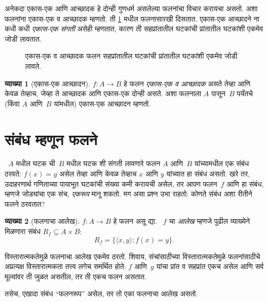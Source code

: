 \documentclass[11pt,a4paper,openany]{book}
\theoremstyle{definition}
\newtheorem{defn}{व्याख्या}[section]
\newenvironment{explain}{}{}
\newcommand{\Setabs}[2]{\{#1:#2\}}
\newcommand{\tuple}[1]{\langle #1\rangle}
\newcommand{\olasset}[2][0.52\textwidth]{\centering\resizebox{#1}{!}{}}
\begin{document}
\begin{explain}
अनेकदा एकास-एक आणि आच्छादक हे दोन्ही गुणधर्म असलेल्या
फलनांचा विचार करायचा असतो. अशा फलनांना एकास-एक व आच्छादक म्हणतो.
ती \ref{sfr:fun:kin:fig:bijective} मधील फलनासारखी दिसतात. एकास-एक आच्छादने ना
कधी कधी \emph{एकास-एक संगती} असेही म्हणतात, कारण ती सहप्रांतातील
घटकांची प्रांतातील घटकांशी एकमेव जोडी लावतात.
\begin{figure}
  \olasset{assets/diagrams/bijective.tikz}
  \caption{एकास-एक व आच्छादक फलन सहप्रांतातील घटकांची प्रांतातील
    घटकांशी एकमेव जोडी लावते.}
  \label{sfr:fun:kin:fig:bijective}
\end{figure}
\end{explain}

\begin{defn}[एकास-एक आच्छादन]
$f \colon A \to B$ हे फलन \emph{एकास-एक व आच्छादक} असते तेव्हा आणि
केवळ तेव्हाच, जेव्हा ते आच्छादक आणि एकास-एक दोन्ही असते.
अशा फलनाला $A$ पासून~$B$ पर्यंतचे (किंवा $A$ आणि~$B$ यांमधील)
एकास-एक आच्छादन म्हणतो.
\end{defn}










\section{संबंध म्हणून फलने}\label{sfr:fun:rel:sec}

\begin{explain}
~$A$ मधील घटक ची~$B$ मधील घटक शी संगती लावणारे
फलन $A$ आणि~$B$ यांच्यामधील एक संबंध ठरवते: $f(x) = y$ असेल
तेव्हा आणि केवळ तेव्हाच $x$ आणि $y$ यांच्यात हा संबंध असतो.
खरे तर, उदाहरणार्थ गणिताच्या पायाभूत घटकांची संख्या कमी करायची असेल,
तर आपण फलन~$f$ आणि हा संबंध, म्हणजे जोड्यांचा एक संच, \emph{एकरूप}
मानू शकतो. मग असा प्रश्न उभा राहतो: कोणते संबंध अशा रीतीने फलने ठरवतात?
\end{explain}

\begin{defn}[फलनाचा आलेख] $f\colon A \to B$ हे फलन असू द्या.
~$f$ चा \emph{आलेख} म्हणजे पुढील व्याख्येने मिळणारा संबंध
$R_f \subseteq A \times B$:
\[
R_f = \Setabs{\tuple{x,y}}{f(x) = y}.
\]
\end{defn}

\begin{explain}
विस्तारात्मकतेमुळे फलनाचा आलेख एकमेव ठरतो. शिवाय, संचांसाठीच्या
विस्तारात्मकतेमुळे फलनांसाठीचे अप्रत्यक्ष विस्तारात्मकता तत्त्व लगेच
समर्थित होते: $f$ आणि~$g$ यांचा प्रांत व सहप्रांत एकच असेल आणि
सर्व मूल्यांवर ती जुळत असतील, तर ती एकच फलन असतात.

तसेच, एखादा संबंध ``फलनरूप'' असेल, तर तो एका फलनाचा आलेख असतो.
\end{explain}
\end{document}
